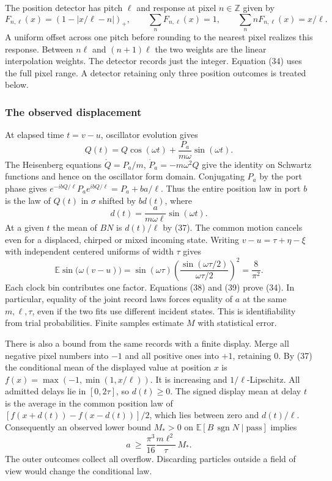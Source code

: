 \documentclass[11pt,a4paper]{article}
\begin{document}
The position detector has pitch \(\ell\) and response at pixel
\(n\in\mathbb Z\) given by \[
 F_{n,\ell}(x)=(1-|x/\ell-n|)_+,\qquad
 \sum_n F_{n,\ell}(x)=1,\qquad \sum_n n F_{n,\ell}(x)=x/\ell .
 \tag{37}
\] A uniform offset across one pitch before rounding to the nearest
pixel realizes this response. Between \(n\ell\) and \((n+1)\ell\) the
two weights are the linear interpolation weights. The detector records
just the integer. Equation (34) uses the full pixel range. A detector
retaining only three position outcomes is treated below.

\subsubsection{The observed
displacement}\label{the-observed-displacement}

At elapsed time \(t=v-u\), oscillator evolution gives \[
 Q(t)=Q\cos(\omega t)+\frac{P_a}{m\omega}\sin(\omega t).
\] The Heisenberg equations \(\dot Q=P_a/m\), \(\dot P_a=-m\omega^2Q\)
give the identity on Schwartz functions and hence on the oscillator form
domain. Conjugating \(P_a\) by the port phase gives
\(e^{-ibQ/\ell}P_a e^{ibQ/\ell}=P_a+b a/\ell\). Thus the entire position
law in port \(b\) is the law of \(Q(t)\) in \(\sigma\) shifted by
\(b d(t)\), where \[
 d(t)=\frac{a}{m\omega\ell}\sin(\omega t).
 \tag{38}
\] At a given \(t\) the mean of \(BN\) is \(d(t)/\ell\) by (37). The
common motion cancels even for a displaced, chirped or mixed incoming
state. Writing \(v-u=\tau+\eta-\xi\) with independent centered uniforms
of width \(\tau\) gives \[
 \mathbb E\sin\big(\omega(v-u)\big)
 =\sin(\omega\tau)
  \left(\frac{\sin(\omega\tau/2)}{\omega\tau/2}\right)^2
 =\frac{8}{\pi^2}.
 \tag{39}
\] Each clock bin contributes one factor. Equations (38) and (39) prove
(34). In particular, equality of the joint record laws forces equality
of \(a\) at the same \(m,\ell,\tau\), even if the two fits use different
incident states. This is identifiability from trial probabilities.
Finite samples estimate \(M\) with statistical error.

There is also a bound from the same records with a finite display. Merge
all negative pixel numbers into \(-1\) and all positive ones into
\(+1\), retaining \(0\). By (37) the conditional mean of the displayed
value at position \(x\) is \(f(x)=\max(-1,\min(1,x/\ell))\). It is
increasing and \(1/\ell\)-Lipschitz. All admitted delays lie in
\([0,2\tau]\), so \(d(t)\ge0\). The signed display mean at delay \(t\)
is the average in the common position law of
\([f(x+d(t))-f(x-d(t))]/2\), which lies between zero and \(d(t)/\ell\).
Consequently an observed lower bound \(M_*>0\) on
\(\mathbb E[B\,\operatorname{sgn}N\mid\mathrm{pass}]\) implies \[
 a\ \ge\ \frac{\pi^3}{16}\frac{m\ell^2}{\tau}\,M_* .
 \tag{40}
\] The outer outcomes collect all overflow. Discarding particles outside
a field of view would change the conditional law.
\end{document}
